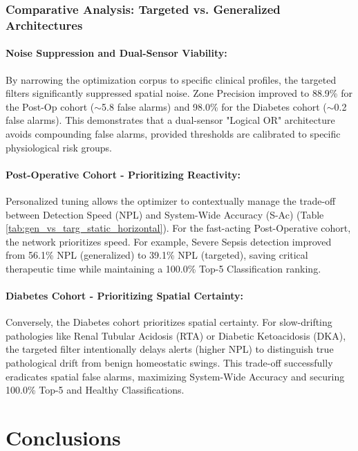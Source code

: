 \documentclass[sigconf]{acmart}
\begin{document}
\subsubsection{Comparative Analysis: Targeted vs. Generalized Architectures}

\paragraph{Noise Suppression and Dual-Sensor Viability:}
By narrowing the optimization corpus to specific clinical profiles, the targeted filters significantly suppressed spatial noise. Zone Precision improved to 88.9\% for the Post-Op cohort ($\sim$5.8 false alarms) and 98.0\% for the Diabetes cohort ($\sim$0.2 false alarms). This demonstrates that a dual-sensor "Logical OR" architecture avoids compounding false alarms, provided thresholds are calibrated to specific physiological risk groups.

\paragraph{Post-Operative Cohort - Prioritizing Reactivity:}
Personalized tuning allows the optimizer to contextually manage the trade-off between Detection Speed (NPL) and System-Wide Accuracy (S-Ac) (Table \ref{tab:gen_vs_targ_static_horizontal}). For the fast-acting Post-Operative cohort, the network prioritizes speed. For example, Severe Sepsis detection improved from 56.1\% NPL (generalized) to 39.1\% NPL (targeted), saving critical therapeutic time while maintaining a 100.0\% Top-5 Classification ranking.

\paragraph{Diabetes Cohort - Prioritizing Spatial Certainty:}
Conversely, the Diabetes cohort prioritizes spatial certainty. For slow-drifting pathologies like Renal Tubular Acidosis (RTA) or Diabetic Ketoacidosis (DKA), the targeted filter intentionally delays alerts (higher NPL) to distinguish true pathological drift from benign homeostatic swings. This trade-off successfully eradicates spatial false alarms, maximizing System-Wide Accuracy and securing 100.0\% Top-5 and Healthy Classifications.

\section{Conclusions}
\end{document}

